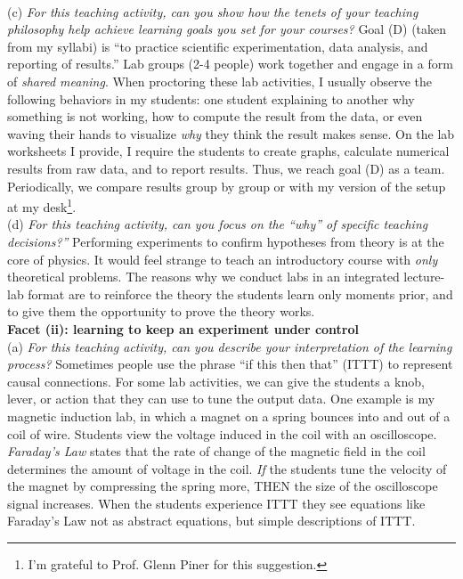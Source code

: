 \documentclass[../../../main.tex]{subfiles}
\begin{document}
\\
\vspace{0.25cm}
(c) \textit{For this teaching activity, can you show how the tenets of your teaching philosophy help achieve learning goals you set for your courses?}  Goal (D) (taken from my syllabi) is ``to practice scientific experimentation, data analysis, and reporting of results.''  Lab groups (2-4 people) work together and engage in a form of \textit{shared meaning}.  When proctoring these lab activities, I usually observe the following behaviors in my students: one student explaining to another why something is not working, how to compute the result from the data, or even waving their hands to visualize \textit{why} they think the result makes sense.  On the lab worksheets I provide, I require the students to create graphs, calculate numerical results from raw data, and to report results.  Thus, we reach goal (D) as a team.  Periodically, we compare results group by group or with my version of the setup at my desk\footnote{I'm grateful to Prof. Glenn Piner for this suggestion.}.
\\
\vspace{0.25cm}
(d) \textit{For this teaching activity, can you focus on the ``why'' of specific teaching decisions?''}  Performing experiments to confirm hypotheses from theory is at the core of physics.  It would feel strange to teach an introductory course with \textit{only} theoretical problems.  The reasons why we conduct labs in an integrated lecture-lab format are to reinforce the theory the students learn only moments prior, and to give them the opportunity to prove the theory works.
\\
\vspace{0.25cm}
\textbf{Facet (ii): learning to keep an experiment under control}
\\
\vspace{0.25cm}
(a) \textit{For this teaching activity, can you describe your interpretation of the learning process?}  Sometimes people use the phrase ``if this then that'' (ITTT) to represent causal connections.  For some lab activities, we can give the students a knob, lever, or action that they can use to tune the output data.  One example is my magnetic induction lab, in which a magnet on a spring bounces into and out of a coil of wire.  Students view the voltage induced in the coil with an oscilloscope.  \textit{Faraday's Law} states that the rate of change of the magnetic field in the coil determines the amount of voltage in the coil.  \textit{If} the students tune the velocity of the magnet by compressing the spring more, THEN the size of the oscilloscope signal increases.  When the students experience ITTT they see equations like Faraday's Law not as abstract equations, but simple descriptions of ITTT.
\end{document}
